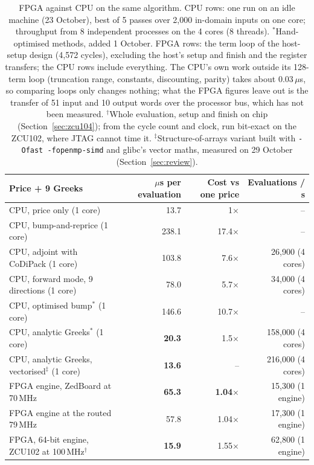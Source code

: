 \documentclass[11pt,a4paper]{article}
\newcommand{\hi}{\rowcolor{accentsoft}}
\begin{document}
\begin{table}[H]
\centering
\small
\begin{tabular}{@{}lrrr@{}}
\toprule
\textbf{Price + 9 Greeks} & \textbf{$\mu$s per evaluation} & \textbf{Cost vs one price} & \textbf{Evaluations / s}\\
\midrule
CPU, price only (1 core) & 13.7 & 1$\times$ & --\\
CPU, bump-and-reprice (1 core) & 238.1 & 17.4$\times$ & --\\
CPU, adjoint with CoDiPack (1 core) & 103.8 & 7.6$\times$ & 26,900 (4 cores)\\
CPU, forward mode, 9 directions (1 core) & 78.0 & 5.7$\times$ & 34,000 (4 cores)\\
CPU, optimised bump$^{*}$ (1 core) & 146.6 & 10.7$\times$ & --\\
CPU, analytic Greeks$^{*}$ (1 core) & \textbf{20.3} & 1.5$\times$ & 158,000 (4 cores)\\
CPU, analytic Greeks, vectorised$^{\ddagger}$ (1 core) & \textbf{13.6} & -- & 216,000 (4 cores)\\
\hi FPGA engine, ZedBoard at 70\,MHz & \textbf{65.3} & \textbf{1.04$\times$} & 15,300 (1 engine)\\
FPGA engine at the routed 79\,MHz & 57.8 & 1.04$\times$ & 17,300 (1 engine)\\
\hi FPGA, 64-bit engine, ZCU102 at 100\,MHz$^{\dagger}$ & \textbf{15.9} & 1.55$\times$ & 62,800 (1 engine)\\
\bottomrule
\end{tabular}
\caption{FPGA against CPU on the same algorithm. CPU rows: one run on an idle machine
(23 October), best of 5 passes over 2,000 in-domain inputs on one core; throughput from 8
independent processes on the 4 cores (8 threads). $^{*}$Hand-optimised methods, added
1 October. FPGA rows: the term
loop of the host-setup design (4,572 cycles), excluding the host's setup and finish
and the register transfers; the CPU rows include everything. The CPU's own work
outside its 128-term loop (truncation range, constants, discounting, parity) takes about
0.03\,$\mu$s, so comparing loops only changes nothing; what the FPGA figures leave out
is the transfer of 51 input and 10 output words over the processor bus, which has not
been measured. $^{\dagger}$Whole evaluation, setup and finish on chip
(Section~\ref{sec:zcu104}); from the cycle count and clock, run bit-exact on the ZCU102,
where JTAG cannot time it. $^{\ddagger}$Structure-of-arrays variant built with
\texttt{-Ofast -fopenmp-simd} and glibc's vector maths, measured on 29 October
(Section~\ref{sec:review}).}
\end{table}
\end{document}
